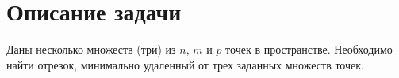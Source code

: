 \documentclass[article,final,14pt]{scrreprt}
\begin{document}
\newtheorem{theorem}{Теорема}

\newtheorem{problem}{Задача}[chapter]

\newtheorem{lemma}{Лемма}[chapter]

\newtheorem{clair}{Утверждение}[chapter]

\newtheorem{definition}{Определение}[chapter]

\newtheorem{property}{Свойство}[chapter]

\newtheorem{conseq}{Следствие}[chapter]

\newtheorem{properties}{Свойства}[chapter]

\newtheorem*{remark}{Замечание}

\newenvironment{Proof}       
	{\par\noindent{\bf Доказательство.}}
	{\hfill$\blacksquare$}

\newenvironment{solution}       
	{\par\noindent{\bf Решение.}}
	{\hfill$\blacksquare$}

\newcommand{\red}[1]{\textbf{\color{red}#1}}
\newcommand{\blue}[1]{\textbf{\color{blue}#1}}

\def\ton#1{1,2,\dots,#1}
\def\Set#1#2{\left\{#1\colon#2\right\}}
\def\MYdef{\mathrel{\stackrel{\rm def}=}}



\tableofcontents

\chapter{Описание задачи}

Даны несколько множеств (три) из $n$, $m$ и $p$ точек в пространстве. Необходимо найти отрезок, минимально удаленный от трех заданных множеств точек.
\end{document}
